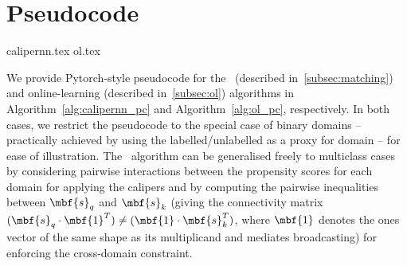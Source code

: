 \section{Pseudocode}\label{appx:pseudocode}

{calipernn.tex}
{ol.tex}

We provide Pytorch-style \citep{paszke2019pytorch} pseudocode for the \CNN\
(described in~\ref{subsec:matching}) and online-learning (described in~\ref{subsec:ol}) algorithms
in Algorithm~\ref{alg:calipernn_pc} and Algorithm~\ref{alg:ol_pc}, respectively.
In both cases, we restrict the pseudocode to the special case of binary domains --
 practically achieved by using the labelled/unlabelled as a proxy for domain -- 
for ease of illustration.
The \CNN\ algorithm can be generalised freely to multiclass cases by considering pairwise
interactions between the propensity scores for each domain for applying the calipers and by
computing the pairwise inequalities between $\mbf{s}_q$ and $\mbf{s}_k$ (giving the connectivity
matrix $(\mbf{s}_q \cdot \mbf{1}^T) \neq (\mbf{1} \cdot \mbf{s}_k^T)$, where $\mbf{1}$ denotes the
ones vector of the same shape as its multiplicand and mediates broadcasting) for enforcing the
cross-domain constraint.
 
